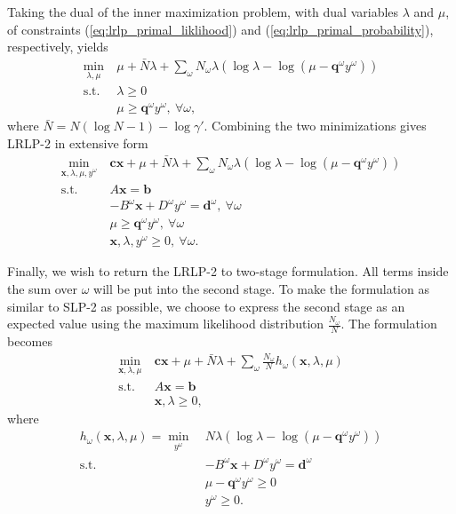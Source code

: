 \documentclass[11pt]{article}
\newcommand{\x}{\mathbf{x}}
\renewcommand{\c}{\mathbf{c}}
\newcommand{\q}{\mathbf{q}}
\renewcommand{\b}{\mathbf{b}}
\renewcommand{\d}{\mathbf{d}}
\newcommand{\st}{\mbox{s.t.}}
\begin{document}
Taking the dual of the inner maximization problem, with dual variables $\lambda$ and $\mu$, of constraints (\ref{eq:lrlp_primal_liklihood}) and (\ref{eq:lrlp_primal_probability}), respectively, yields
\begin{align*}
	\min_{\lambda,\mu} \ & \mu + \bar{N}\lambda + \sum_\omega N_\omega\lambda(\log\lambda - \log(\mu-\q^\omega y^\omega)) \\
	\st \ & \lambda \geq 0 \\
	& \mu \geq \q^\omega y^\omega, \ \forall \omega,
\end{align*}
where $\bar{N} = N(\log N - 1) - \log\gamma'$.
Combining the two minimizations gives LRLP-2 in extensive form
\begin{align}
	\min_{\x,\lambda,\mu,y^\omega} \ & \c\x + \mu + \bar{N}\lambda + \sum_\omega N_\omega\lambda(\log\lambda - \log(\mu-\q^\omega y^\omega)) \nonumber \\
	\st \ & A\x = \b \nonumber \\
	& -B^\omega \x + D^\omega y^\omega = \d^\omega,\ \forall \omega \label{eq:lrlp_det_equiv} \\
	& \mu \geq \q^\omega y^\omega, \ \forall \omega \nonumber \\
	& \x,\lambda,y^\omega \geq 0, \ \forall \omega. \nonumber
\end{align}

Finally, we wish to return the LRLP-2 to two-stage formulation.
All terms inside the sum over $\omega$ will be put into the second stage.
To make the formulation as similar to SLP-2 as possible, we choose to express the second stage as an expected value using the maximum likelihood distribution $\frac{N_\omega}{N}$.
The formulation becomes
\begin{align}
	\min_{\x,\lambda,\mu} \ & \c\x + \mu + \bar{N}\lambda + \sum_\omega \frac{N_\omega}{N} h_\omega(\x,\lambda,\mu) \nonumber \\
	\st \ & A\x = \b \label{eq:lrlp_two_stage} \\
	& \x,\lambda \geq 0, \nonumber
\end{align}
where
\begin{align}
	h_\omega(\x,\lambda,\mu) = \min_{y^\omega} \ & N\lambda (\log\lambda - \log(\mu - \q^\omega y^\omega)) \label{eq:lrlp_second_stage} \\
	\st \ & -B^\omega \x + D^\omega y^\omega = \d^\omega \nonumber \\
	& \mu - \q^\omega y^\omega \geq 0 \label{eq:lrlp_feas_constraint} \\
	& y^\omega \geq 0. \nonumber
\end{align}
\end{document}
